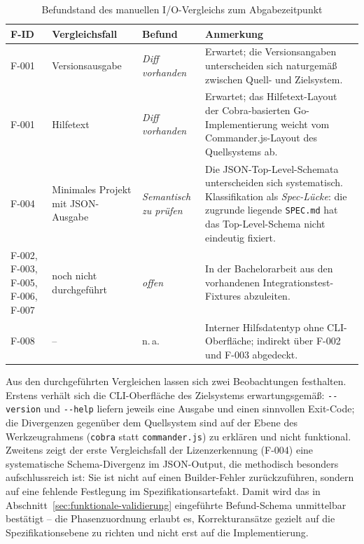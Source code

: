 \begin{table}[H]
\centering
\begin{tabular}{|p{1.5cm}|p{3.5cm}|p{3.0cm}|p{5.0cm}|}
\hline
\textbf{F-ID} & \textbf{Vergleichsfall} & \textbf{Befund} & \textbf{Anmerkung} \\
\hline
F-001 & Versionsausgabe & \emph{Diff vorhanden} & Erwartet; die Versionsangaben unterscheiden sich naturgemäß zwischen Quell- und Zielsystem. \\
\hline
F-001 & Hilfetext & \emph{Diff vorhanden} & Erwartet; das Hilfetext-Layout der Cobra-basierten Go-Implementierung weicht vom Commander.js-Layout des Quellsystems ab. \\
\hline
F-004 & Minimales Projekt mit JSON-Ausgabe & \emph{Semantisch zu prüfen} & Die JSON-Top-Level-Schemata unterscheiden sich systematisch. Klassifikation als \emph{Spec-Lücke}: die zugrunde liegende \texttt{SPEC.md} hat das Top-Level-Schema nicht eindeutig fixiert. \\
\hline
F-002, F-003, F-005, F-006, F-007 & noch nicht durchgeführt & \emph{offen} & In der Bachelorarbeit aus den vorhandenen Integrationstest-Fixtures abzuleiten. \\
\hline
F-008 & -- & n.\,a. & Interner Hilfsdatentyp ohne CLI-Oberfläche; indirekt über F-002 und F-003 abgedeckt. \\
\hline
\end{tabular}
\caption{Befundstand des manuellen I/O-Vergleichs zum Abgabezeitpunkt}
\label{tab:io-befunde}
\end{table}

Aus den durchgeführten Vergleichen lassen sich zwei Beobachtungen festhalten. Erstens verhält sich die CLI-Oberfläche des Zielsystems erwartungsgemäß: \texttt{-{}-version} und \texttt{-{}-help} liefern jeweils eine Ausgabe und einen sinnvollen Exit-Code; die Divergenzen gegenüber dem Quellsystem sind auf der Ebene des Werkzeugrahmens (\texttt{cobra} statt \texttt{commander.js}) zu erklären und nicht funktional. Zweitens zeigt der erste Vergleichsfall der Lizenzerkennung (F-004) eine systematische Schema-Divergenz im JSON-Output, die methodisch besonders aufschlussreich ist: Sie ist nicht auf einen Builder-Fehler zurückzuführen, sondern auf eine fehlende Festlegung im Spezifikationsartefakt. Damit wird das in Abschnitt~\ref{sec:funktionale-validierung} eingeführte Befund-Schema unmittelbar bestätigt -- die Phasenzuordnung erlaubt es, Korrekturansätze gezielt auf die Spezifikationsebene zu richten und nicht erst auf die Implementierung.
